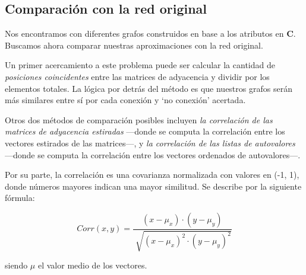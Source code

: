 
\vspace{2em}
\subsection{Comparación con la red original}


Nos encontramos con diferentes grafos construidos en base a los atributos en \textbf{C}. Buscamos ahora comparar nuestras aproximaciones con la red original. 

\vspace{1em}
Un primer acercamiento a este problema puede ser calcular la cantidad de \textit{posiciones coincidentes} entre las matrices de adyacencia y dividir por los elementos totales. La lógica por detrás del método es que nuestros grafos serán más similares entre sí por cada conexión y `no conexión' acertada. %

Otros dos métodos de comparación posibles incluyen \textit{la correlación de las matrices de adyacencia estiradas} ---donde se computa la correlación entre los vectores estirados de las matrices---, y \textit{la correlación de las listas de autovalores} ---donde se computa la correlación entre los vectores ordenados de autovalores---. 

Por su parte, la correlación es una covarianza normalizada con valores en (-1, 1), donde números mayores indican una mayor similitud. Se describe por la siguiente fórmula:

\vspace{1em}
\begin{equation}
    Corr(x, y) = \frac{(x - \mu_{x}) \cdot (y - \mu_{y})}{\sqrt[]{(x - \mu_{x})^{2} \cdot (y - \mu_{y})^{2}}}
    \label{eq:corr}
\end{equation}

\vspace{1em}
\noindent siendo $\mu$ el valor medio de los vectores.

